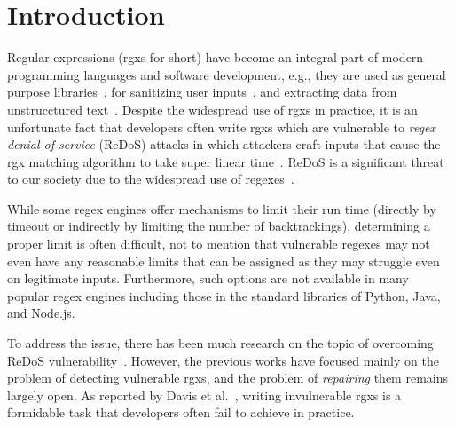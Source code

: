 \documentclass[conference]{IEEEtran}
\newcommand{\tchanged}[2]{#2}
\begin{document}
\section{Introduction}
\label{sec:intro}
Regular expressions ({rgxs} for short) have become an integral part of modern programming languages and software development, e.g., they are used as general purpose libraries~\cite{10.1145/2931037.2931073, RussCox}, for sanitizing user inputs~\cite{10.5555/2028067.2028068, 10.1145/2931037.2931050}, and extracting data from {unstrucctured} text~\cite{7374717, li-etal-2008-regular}.
Despite the widespread use of {rgxs} in practice, it is an unfortunate fact that developers often 
write {rgxs} which are vulnerable to {\em regex denial-of-service} (ReDoS) attacks in which attackers craft inputs that cause the {rgx} matching algorithm to take super linear time~\cite{Davis:2018:IRE:3236024.3236027,ReDoS}.  ReDoS is a significant threat to our society due to the widespread use of regexes~\cite{Davis:2018:IRE:3236024.3236027,ReDoSIncident02, ReDoSIncident01, 217517}.
\tchanged{}{
While some regex engines offer mechanisms to limit their run time (directly by timeout or indirectly by limiting the number of backtrackings), determining a proper limit is often difficult, not to mention that vulnerable regexes may not even have any reasonable limits that can be assigned as they may struggle even on legitimate inputs.  Furthermore, such options are not available in many popular regex engines including those in the standard libraries of Python, Java, and Node.js.}


\tchanged{While}{To address the issue,} there has been much research on the topic of overcoming ReDoS vulnerability~\cite{10.1007/978-3-662-54580-5_1, Shen:2018:RCR:3238147.3238159,10.1007/978-3-319-40946-7_27, 10.1007/978-3-642-38631-2_11, SatoshiSugiyama2014,revealear}\tchanged{,}{.  However,} the previous works have focused mainly on the problem of detecting vulnerable {rgxs}, and the problem of {\em repairing} them remains largely open.  As reported by Davis et al.~\cite{DavisReport, Davis:2018:IRE:3236024.3236027}, writing invulnerable {rgxs} is a formidable task that developers often fail to achieve in practice.
\end{document}

